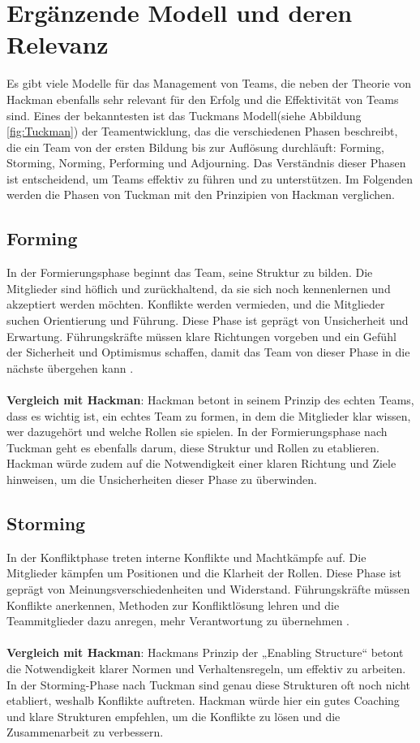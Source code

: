 \chapter{Ergänzende Modell und deren Relevanz}
Es gibt viele Modelle für das Management von Teams, die neben der Theorie von Hackman ebenfalls sehr relevant für den Erfolg und die Effektivität von Teams sind. Eines der bekanntesten ist das Tuckmans Modell(siehe Abbildung \ref{fig:Tuckman}) der Teamentwicklung, das die verschiedenen Phasen beschreibt, die ein Team von der ersten Bildung bis zur Auflösung durchläuft: Forming, Storming, Norming, Performing und Adjourning. Das Verständnis dieser Phasen ist entscheidend, um Teams effektiv zu führen und zu unterstützen. Im Folgenden werden die Phasen von Tuckman mit den Prinzipien von Hackman verglichen.
\section{Forming}
In der Formierungsphase beginnt das Team, seine Struktur zu bilden. Die Mitglieder sind höflich und zurückhaltend, da sie sich noch kennenlernen und akzeptiert werden möchten. Konflikte werden vermieden, und die Mitglieder suchen Orientierung und Führung. Diese Phase ist geprägt von Unsicherheit und Erwartung. Führungskräfte müssen klare Richtungen vorgeben und ein Gefühl der Sicherheit und Optimismus schaffen, damit das Team von dieser Phase in die nächste übergehen kann \cite{WESTCHETERUNIVERSITY}. \\\\
\textbf{Vergleich mit Hackman}: Hackman betont in seinem Prinzip des echten Teams, dass es wichtig ist, ein echtes Team zu formen, in dem die Mitglieder klar wissen, wer dazugehört und welche Rollen sie spielen. In der Formierungsphase nach Tuckman geht es ebenfalls darum, diese Struktur und Rollen zu etablieren. Hackman würde zudem auf die Notwendigkeit einer klaren Richtung und Ziele hinweisen, um die Unsicherheiten dieser Phase zu überwinden.

\section{Storming}
In der Konfliktphase treten interne Konflikte und Machtkämpfe auf. Die Mitglieder kämpfen um Positionen und die Klarheit der Rollen. Diese Phase ist geprägt von Meinungsverschiedenheiten und Widerstand. Führungskräfte müssen Konflikte anerkennen, Methoden zur Konfliktlösung lehren und die Teammitglieder dazu anregen, mehr Verantwortung zu übernehmen \cite{WESTCHETERUNIVERSITY}.\\\\
\textbf{Vergleich mit Hackman}: Hackmans Prinzip der „Enabling Structure“ betont die Notwendigkeit klarer Normen und Verhaltensregeln, um effektiv zu arbeiten. In der Storming-Phase nach Tuckman sind genau diese Strukturen oft noch nicht etabliert, weshalb Konflikte auftreten. Hackman würde hier ein gutes Coaching und klare Strukturen empfehlen, um die Konflikte zu lösen und die Zusammenarbeit zu verbessern.

